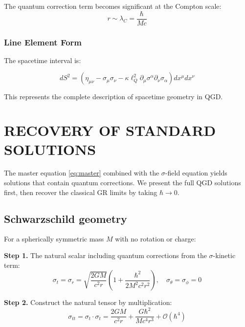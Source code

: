 \documentclass[11pt,a4paper]{article}
\theoremstyle{definition}
\theoremstyle{remark}
\begin{document}
	The quantum correction term becomes significant at the Compton scale:
	\begin{equation}
		r \sim \lambda_C = \frac{\hbar}{Mc}
	\end{equation}
	
	\subsubsection{Line Element Form}
	
	The spacetime interval is:
	
	\begin{equation}
		\boxed{dS^2 = \left(\eta_{\mu\nu} - \sigma_\mu\sigma_\nu - \kappa\ell_Q^2 \partial_\mu\sigma^\alpha \partial_\nu\sigma_\alpha\right) dx^\mu dx^\nu}
		\label{eq:line_element_quantum}
	\end{equation}
	
	This represents the complete description of spacetime geometry in QGD.
	
	\section{RECOVERY OF STANDARD SOLUTIONS}
	\label{sec:recovery}
	
	The master equation \eqref{eq:master} combined with the $\sigma$-field equation yields solutions that contain quantum corrections. We present the full QGD solutions first, then recover the classical GR limits by taking $\hbar \to 0$.
	
	\subsection{Schwarzschild geometry}
	
	For a spherically symmetric mass $M$ with no rotation or charge:
	
	\textbf{Step 1.} The natural scalar including quantum corrections from the $\sigma$-kinetic term:
	\begin{equation}
		\sigma_t = \sigma_r = \sqrt{\frac{2GM}{c^2 r}}\left(1 + \frac{\hbar^2}{2M^2 c^2 r^2}\right), \quad \sigma_\theta = \sigma_\phi = 0
		\label{eq:sigma_schwarzschild}
	\end{equation}
	
	\textbf{Step 2.} Construct the natural tensor by multiplication:
	\begin{equation}
		\sigma_{tt} = \sigma_t \cdot \sigma_t = \frac{2GM}{c^2 r} + \frac{G\hbar^2}{Mc^4 r^3} + \mathcal{O}(\hbar^4)
		\label{eq:sigma_tt_schwarzschild}
	\end{equation}
	
\end{document}
